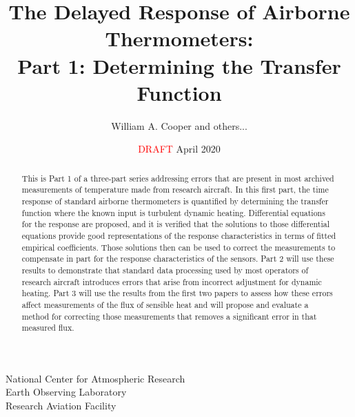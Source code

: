 \documentclass[11pt,twoside,american,12pt,twoside,american]{article}\usepackage[]{graphicx}\usepackage[]{color}
\begin{document}
\title{The Delayed Response of Airborne Thermometers:\\
Part 1: Determining the Transfer Function}
\author{William A. Cooper and others...}
\date{\textcolor{red}{DRAFT} April 2020}

\maketitle
National Center for Atmospheric Research\\
Earth Observing Laboratory\\
Research Aviation Facility

\vfill{}
\cleardoublepage{} 

\renewcommand{\contentsname}{Table of Contents} \tableofcontents{}
\vfill{}
\eject



\listoffigures

\clearpage %

\listoftables

\clearpage{}

\renewcommand{\abstractname}{Preface and Abstract}\thispagestyle{plain}\begin{abstract}

This is Part 1 of a three-part series addressing errors that are present
in most archived measurements of temperature made from research aircraft.
In this first part, the time response of standard airborne thermometers
is quantified by determining the transfer function where the known
input is turbulent dynamic heating. Differential equations for the
response are proposed, and it is verified that the solutions to those
differential equations provide good representations of the response
characteristics in terms of fitted empirical coefficients. Those solutions
then can be used to correct the measurements to compensate in part
for the response characteristics of the sensors. Part 2 will use these
results to demonstrate that standard data processing used by most
operators of research aircraft introduces errors that arise from incorrect
adjustment for dynamic heating. Part 3 will use the results from the
first two papers to assess how these errors affect measurements of
the flux of sensible heat and will propose and evaluate a method for
correcting those measurements that removes a significant error in
that measured flux.

\end{abstract}
\end{document}
